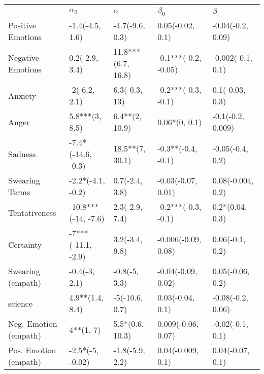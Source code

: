 \begin{tabular}{lllll}
\toprule
{} &           $\alpha_0$ &            $\alpha$ &             $\beta_0$ &            $\beta$ \\
\midrule
Positive Emotions     &      -1.4(-4.5, 1.6) &     -4.7(-9.6, 0.3) &      0.05(-0.02, 0.1) &  -0.04(-0.2, 0.09) \\
Negative Emotions     &       0.2(-2.9, 3.4) &  11.8***(6.7, 16.8) &  -0.1***(-0.2, -0.05) &  -0.002(-0.1, 0.1) \\
Anxiety               &        -2(-6.2, 2.1) &       6.3(-0.3, 13) &   -0.2***(-0.3, -0.1) &    0.1(-0.03, 0.3) \\
Anger                 &       5.8***(3, 8.5) &      6.4**(2, 10.9) &         0.06*(0, 0.1) &  -0.1(-0.2, 0.009) \\
Sadness               &   -7.4*(-14.6, -0.3) &     18.5**(7, 30.1) &    -0.3**(-0.4, -0.1) &   -0.05(-0.4, 0.2) \\
Swearing Terms        &    -2.2*(-4.1, -0.2) &      0.7(-2.4, 3.8) &    -0.03(-0.07, 0.01) &  0.08(-0.004, 0.2) \\
Tentativeness         &  -10.8***(-14, -7.6) &      2.3(-2.9, 7.4) &   -0.2***(-0.3, -0.1) &    0.2*(0.04, 0.3) \\
Certainty             &   -7***(-11.1, -2.9) &      3.2(-3.4, 9.8) &   -0.006(-0.09, 0.08) &    0.06(-0.1, 0.2) \\
Swearing (empath)     &        -0.4(-3, 2.1) &       -0.8(-5, 3.3) &    -0.04(-0.09, 0.02) &   0.05(-0.06, 0.2) \\
science               &      4.9**(1.4, 8.4) &      -5(-10.6, 0.7) &      0.03(-0.04, 0.1) &  -0.08(-0.2, 0.06) \\
Neg. Emotion (empath) &            4**(1, 7) &     5.5*(0.6, 10.3) &    0.009(-0.06, 0.07) &   -0.02(-0.1, 0.1) \\
Pos. Emotion (empath) &     -2.5*(-5, -0.02) &     -1.8(-5.9, 2.2) &     0.04(-0.009, 0.1) &   0.04(-0.07, 0.1) \\
\bottomrule
\end{tabular}
